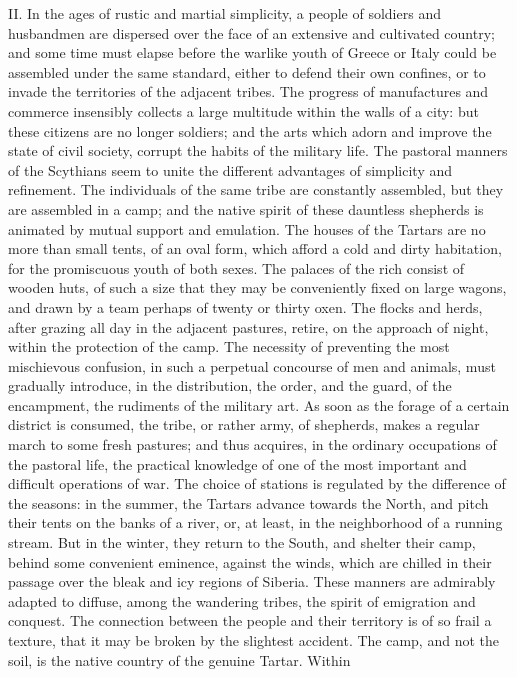 II. In the ages of rustic and martial simplicity, a people of
soldiers and husbandmen are dispersed over the face of an
extensive and cultivated country; and some time must elapse
before the warlike youth of Greece or Italy could be assembled
under the same standard, either to defend their own confines, or
to invade the territories of the adjacent tribes. The progress of
manufactures and commerce insensibly collects a large multitude
within the walls of a city: but these citizens are no longer
soldiers; and the arts which adorn and improve the state of civil
society, corrupt the habits of the military life. The pastoral
manners of the Scythians seem to unite the different advantages
of simplicity and refinement. The individuals of the same tribe
are constantly assembled, but they are assembled in a camp; and
the native spirit of these dauntless shepherds is animated by
mutual support and emulation. The houses of the Tartars are no
more than small tents, of an oval form, which afford a cold and
dirty habitation, for the promiscuous youth of both sexes. The
palaces of the rich consist of wooden huts, of such a size that
they may be conveniently fixed on large wagons, and drawn by a
team perhaps of twenty or thirty oxen. The flocks and herds,
after grazing all day in the adjacent pastures, retire, on the
approach of night, within the protection of the camp. The
necessity of preventing the most mischievous confusion, in such a
perpetual concourse of men and animals, must gradually introduce,
in the distribution, the order, and the guard, of the encampment,
the rudiments of the military art. As soon as the forage of a
certain district is consumed, the tribe, or rather army, of
shepherds, makes a regular march to some fresh pastures; and thus
acquires, in the ordinary occupations of the pastoral life, the
practical knowledge of one of the most important and difficult
operations of war. The choice of stations is regulated by the
difference of the seasons: in the summer, the Tartars advance
towards the North, and pitch their tents on the banks of a river,
or, at least, in the neighborhood of a running stream. But in the
winter, they return to the South, and shelter their camp, behind
some convenient eminence, against the winds, which are chilled in
their passage over the bleak and icy regions of Siberia. These
manners are admirably adapted to diffuse, among the wandering
tribes, the spirit of emigration and conquest. The connection
between the people and their territory is of so frail a texture,
that it may be broken by the slightest accident. The camp, and
not the soil, is the native country of the genuine Tartar. Within
